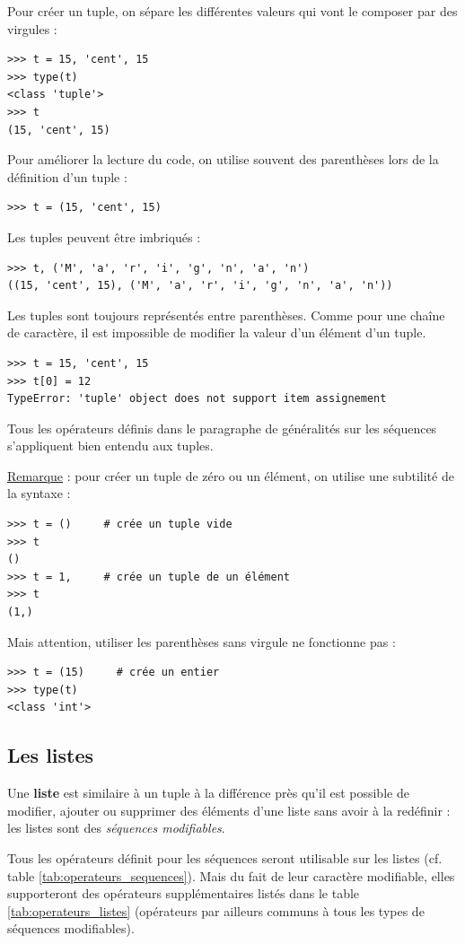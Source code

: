 \documentclass[12pt, a4paper]{article}
\begin{document}
Pour créer un tuple, on sépare les différentes valeurs qui vont le composer par des virgules :
\begin{lstlisting}
>>> t = 15, 'cent', 15
>>> type(t)
<class 'tuple'>
>>> t
(15, 'cent', 15)
\end{lstlisting}

Pour améliorer la lecture du code, on utilise souvent des parenthèses lors de la définition d'un tuple :
\begin{lstlisting}
>>> t = (15, 'cent', 15)
\end{lstlisting}

Les tuples peuvent être imbriqués :
\begin{lstlisting}
>>> t, ('M', 'a', 'r', 'i', 'g', 'n', 'a', 'n')
((15, 'cent', 15), ('M', 'a', 'r', 'i', 'g', 'n', 'a', 'n'))
\end{lstlisting}

Les tuples sont toujours représentés entre parenthèses. Comme pour une chaîne de caractère, il est impossible de modifier la valeur d'un élément d'un tuple.
\begin{lstlisting}
>>> t = 15, 'cent', 15
>>> t[0] = 12
TypeError: 'tuple' object does not support item assignement
\end{lstlisting}

Tous les opérateurs définis dans le paragraphe de généralités sur les séquences s'appliquent bien entendu aux tuples.

\underline{Remarque} : pour créer un tuple de zéro ou un élément, on utilise une subtilité de la syntaxe :
\begin{lstlisting}
>>> t = ()     # crée un tuple vide
>>> t
()
>>> t = 1,     # crée un tuple de un élément
>>> t
(1,)
\end{lstlisting}
Mais attention, utiliser les parenthèses sans virgule ne fonctionne pas :
\begin{lstlisting}
>>> t = (15)     # crée un entier
>>> type(t)
<class 'int'>
\end{lstlisting}


\subsection{Les listes}
Une \textbf{liste} est similaire à un tuple à la différence près qu'il est possible de modifier, ajouter ou supprimer des éléments d'une liste sans avoir à la redéfinir : les listes sont des \textit{séquences modifiables}. 

Tous les opérateurs définit pour les séquences seront utilisable sur les listes (cf. table \ref{tab:operateurs_sequences}). Mais du fait de leur caractère modifiable, elles supporteront des opérateurs supplémentaires listés dans le table \ref{tab:operateurs_listes} (opérateurs par ailleurs communs à tous les types de séquences modifiables).
\end{document}
